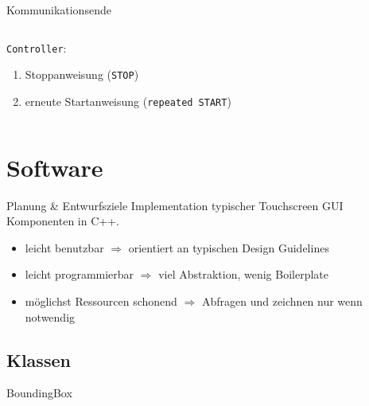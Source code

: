 \documentclass[12pt, aspectratio=169]{beamer}
\begin{document}
	\begin{frame}{Kommunikationsende}
		\begin{columns}
			\begin{column}{0.55\textwidth}
				\texttt{Controller}:
				\begin{enumerate}[a]
					\item Stoppanweisung (\texttt{STOP})
					\item erneute Startanweisung (\texttt{repeated START})
				\end{enumerate}
			\end{column}
			\begin{column}{0.4\textwidth}
				\begin{figure}
					
				\end{figure}
				\begin{figure}
					
				\end{figure}
			\end{column}
		\end{columns}
	\end{frame}
	
	\section{Software}
	\frame{\tableofcontents[currentsection]}
	
	\begin{frame}{Planung \& Entwurfsziele}
		Implementation typischer Touchscreen GUI Komponenten in C++.
		\pause
		\bigskip
		\begin{itemize}
			\item leicht benutzbar $\Rightarrow$ orientiert an typischen Design Guidelines \cite{material-components} \pause
			\item leicht programmierbar $\Rightarrow$ viel Abstraktion, wenig Boilerplate \pause
			\item möglichst Ressourcen schonend $\Rightarrow$ Abfragen und zeichnen nur wenn notwendig
		\end{itemize}
	\end{frame}
	
	\subsection{Klassen}
	\begin{frame}{BoundingBox}
		\centering
		\begin{tikzpicture}
			
		\end{tikzpicture}
	\end{frame}
	
\end{document}
